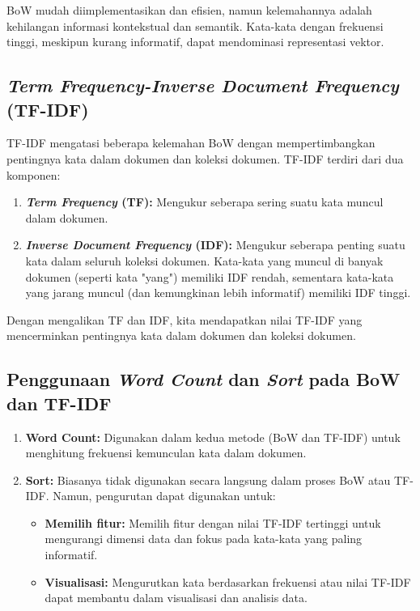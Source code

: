BoW mudah diimplementasikan dan efisien, namun kelemahannya adalah kehilangan informasi kontekstual dan semantik. Kata-kata dengan frekuensi tinggi, meskipun kurang informatif, dapat mendominasi representasi vektor.

\subsection{\textit{Term Frequency-Inverse Document Frequency} (TF-IDF)}

TF-IDF mengatasi beberapa kelemahan BoW dengan mempertimbangkan pentingnya kata dalam dokumen dan koleksi dokumen. TF-IDF terdiri dari dua komponen:

\begin{enumerate}
    \item \textbf{\textit{Term Frequency} (TF): } Mengukur seberapa sering suatu kata muncul dalam dokumen.
    \item \textbf{\textit{Inverse Document Frequency} (IDF): } Mengukur seberapa penting suatu kata dalam seluruh koleksi dokumen. Kata-kata yang muncul di banyak dokumen (seperti kata "yang") memiliki IDF rendah, sementara kata-kata yang jarang muncul (dan kemungkinan lebih informatif) memiliki IDF tinggi.
\end{enumerate}

Dengan mengalikan TF dan IDF, kita mendapatkan nilai TF-IDF yang mencerminkan pentingnya kata dalam dokumen dan koleksi dokumen. 

\subsection{Penggunaan \textit{Word Count} dan \textit{Sort} pada BoW dan TF-IDF}

\begin{enumerate}
    \item \textbf{Word Count:} Digunakan dalam kedua metode (BoW dan TF-IDF) untuk menghitung frekuensi kemunculan kata dalam dokumen.
    \item \textbf{Sort:} Biasanya tidak digunakan secara langsung dalam proses BoW atau TF-IDF. Namun, pengurutan dapat digunakan untuk:
    \begin{itemize}
        \item \textbf{Memilih fitur:} Memilih fitur dengan nilai TF-IDF tertinggi untuk mengurangi dimensi data dan fokus pada kata-kata yang paling informatif. 
        \item \textbf{Visualisasi:} Mengurutkan kata berdasarkan frekuensi atau nilai TF-IDF dapat membantu dalam visualisasi dan analisis data.
    \end{itemize}
\end{enumerate}

